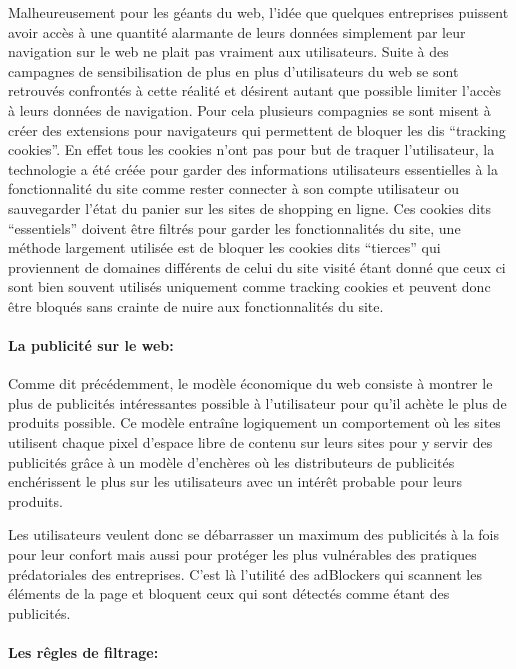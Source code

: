 \documentclass[oneside,a4paper,12pt]{article}
\begin{document}
Malheureusement pour les géants du web, l'idée que quelques entreprises puissent avoir accès à une quantité alarmante de leurs données simplement par leur navigation sur le web ne plait pas vraiment aux utilisateurs. Suite à des campagnes de sensibilisation de plus en plus d'utilisateurs du web se sont retrouvés confrontés à cette réalité et désirent autant que possible limiter l'accès à leurs données de navigation. Pour cela plusieurs compagnies se sont misent à créer des extensions pour navigateurs qui permettent de bloquer les dis ``tracking cookies''. En effet tous les cookies n'ont pas pour but de traquer l'utilisateur, la technologie a été créée pour garder des informations utilisateurs essentielles à la fonctionnalité du site comme rester connecter à son compte utilisateur ou sauvegarder l'état du panier sur les sites de shopping en ligne. Ces cookies dits ``essentiels'' doivent être filtrés pour garder les fonctionnalités du site, une méthode largement utilisée est de bloquer les cookies dits ``tierces'' qui proviennent de domaines différents de celui du site visité étant donné que ceux ci sont bien souvent utilisés uniquement comme tracking cookies et peuvent donc être bloqués sans crainte de nuire aux fonctionnalités du site.

\paragraph*{La publicité sur le web:}

Comme dit précédemment, le modèle économique du web consiste à montrer le plus de publicités intéressantes possible à l'utilisateur pour qu'il achète le plus de produits possible. Ce modèle entraîne logiquement un comportement où les sites utilisent chaque pixel d'espace libre de contenu sur leurs sites pour y servir des publicités grâce à un modèle d'enchères où les distributeurs de publicités enchérissent le plus sur les utilisateurs avec un intérêt probable pour leurs produits.

Les utilisateurs veulent donc se débarrasser un maximum des publicités à la fois pour leur confort mais aussi pour protéger les plus vulnérables des pratiques prédatoriales des entreprises. C'est là l'utilité des adBlockers qui scannent les éléments de la page et bloquent ceux qui sont détectés comme étant des publicités.

\paragraph{Les rêgles de filtrage:}\label{Intro:adblock:filterlists}
\end{document}
